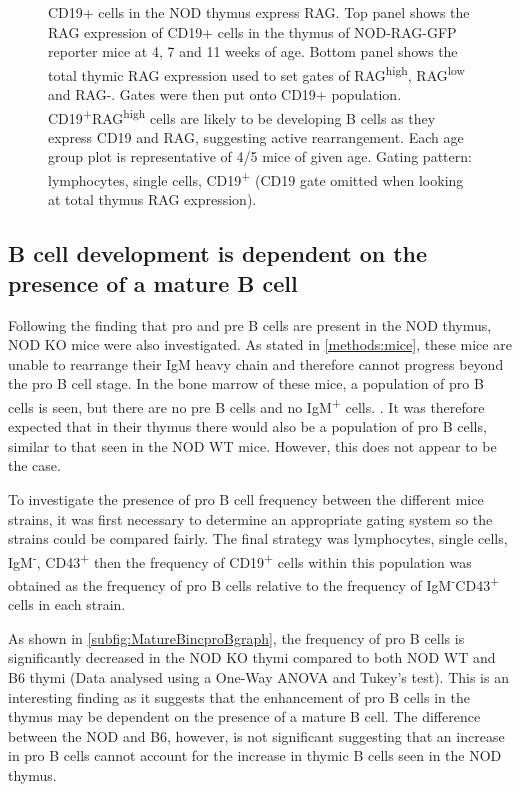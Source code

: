 \begin{figure}
\begin{subfigure}{\textwidth}
	\end{subfigure}
\caption{CD19+ cells in the NOD thymus express RAG. 
Top panel shows the RAG expression of CD19+ cells in the thymus of NOD-RAG-GFP reporter mice at 4, 7 and 11 weeks of age. Bottom panel shows the total thymic RAG expression used to set gates of RAG\textsuperscript{high}, RAG\textsuperscript{low} and RAG-. 
Gates were then put onto CD19+ population. 
CD19\textsuperscript{+}RAG\textsuperscript{high} cells are likely to be developing B cells as they express CD19 and RAG, suggesting active rearrangement. 
Each age group plot is representative of 4/5 mice of given age.
Gating pattern: lymphocytes, single cells, CD19\textsuperscript{+} (CD19 gate omitted when looking at total thymus RAG expression).}
\end{figure}



\subsection{B cell development is dependent on the presence of a mature B cell}

Following the finding that pro and pre B cells are present in the NOD thymus, NOD KO mice were also investigated.
As stated in \cref{methods:mice}, these mice are unable to rearrange their IgM heavy chain and therefore cannot progress beyond the pro B cell stage. 
In the bone marrow of these mice, a population of pro B cells is seen, but there are no pre B cells and no IgM\textsuperscript{+} cells. .
It was therefore expected that in their thymus there would also be a population of pro B cells, similar to that seen in the NOD WT mice. 
However, this does not appear to be the case.

To investigate the presence of pro B cell frequency between the different mice strains, it was first necessary to determine an appropriate gating system so the strains could be compared fairly.
The final strategy was lymphocytes, single cells, IgM\textsuperscript{-}, CD43\textsuperscript{+} then the frequency of CD19\textsuperscript{+} cells within this population was obtained as the frequency of pro B cells relative to the frequency of IgM\textsuperscript{-}CD43\textsuperscript{+} cells in each strain.

As shown in \cref{subfig:MatureBincproBgraph}, the frequency of pro B cells is significantly decreased in the NOD KO thymi compared to both NOD WT and B6 thymi (Data analysed using a One-Way ANOVA and Tukey's test). 
This is an interesting finding as it suggests that the enhancement of pro B cells in the thymus may be dependent on the presence of a mature B cell.
The difference between the NOD and B6, however, is not significant suggesting that an increase in pro B cells cannot account for the increase in thymic B cells seen in the NOD thymus.

